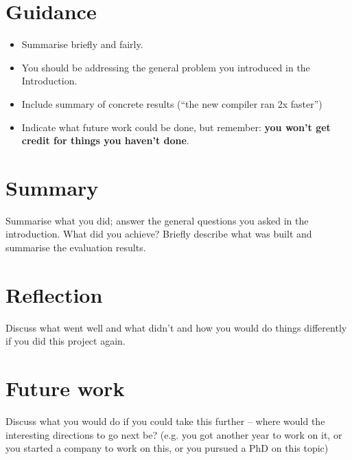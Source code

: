 \documentclass{l4proj}
\begin{document}
\section{Guidance}
\begin{itemize}
    \item
        Summarise briefly and fairly.
    \item
        You should be addressing the general problem you introduced in the
        Introduction.        
    \item
        Include summary of concrete results (``the new compiler ran 2x
        faster'')
    \item
        Indicate what future work could be done, but remember: \textbf{you
        won't get credit for things you haven't done}.
\end{itemize}

\section{Summary}
Summarise what you did; answer the general questions you asked in the introduction. What did you achieve? Briefly describe what was built and summarise the evaluation results.

\section{Reflection}
Discuss what went well and what didn't and how you would do things differently if you did this project again.

\section{Future work}
Discuss what you would do if you could take this further -- where would the interesting directions to go next be? (e.g. you got another year to work on it, or you started a company to work on this, or you pursued a PhD on this topic)

\end{document}
